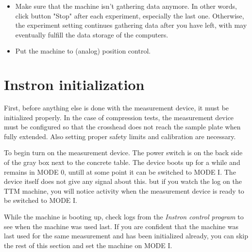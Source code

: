\documentclass[a4paper]{article}
\begin{document}
\begin{itemize}
  \item Make sure that the machine isn't gathering data anymore. In other words, click button "Stop" after each experiment, especially the last one. Otherwise, the experiment setting continues gathering data after you have left, with may eventually fulfill the data storage of the computers.
  \item Put the machine to (analog) position control.
\end{itemize}


\section{Instron initialization}

First, before anything else is done with the measurement device, it
must be initialized properly. In the case of compression tests, the
measurement device must be configured so that the crosshead does not
reach the sample plate when fully extended. Also setting proper safety
limits and calibration are necessary.


To begin turn on the measurement device. The power switch is on the
back side of the gray box next to the concrete table. The device boots
up for a while and remains in \textsf{MODE 0}, untill at some point it
can be switched to \textsf{MODE I}. The device itself does not give
any signal about this. but if you watch the log on the TTM machine,
you will notice activity when the measurement device is ready to be
switched to \textsf{MODE I}.

While the machine is booting up, check logs from the {\it Instron
control program} to see when the machine was used last. If you are
confident that the machine was last used for the same measurement and
has been initialized already, you can skip the rest of this section
and set the machine on \textsf{MODE I}.
\end{document}
